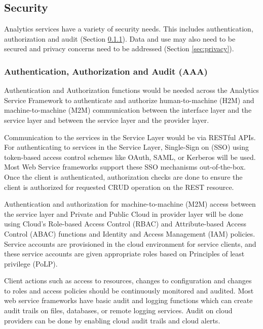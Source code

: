 
\subsection{Security}
\label{sec:security}

Analytics services have a variety of security needs. This includes
authentication, authorization and audit (Section \ref{sec:aaa}). Data
and use may also need to be secured and privacy concerns need to be
addressed (Section \ref{sec:privacy}).

\subsubsection{Authentication, Authorization and Audit (AAA)}\label{sec:aaa}

Authentication and Authorization functions would be needed across the
Analytics Service Framework to authenticate and authorize
human-to-machine (H2M) and machine-to-machine (M2M) communication
between the interface layer and the service layer and between the
service layer and the provider layer.

Communication to the services in the Service Layer would be via
RESTful APIs. For authenticating to services in the Service Layer,
Single-Sign on (SSO) using token-based access control schemes like
OAuth, SAML, or Kerberos will be used. Most Web Service frameworks
support these SSO mechanisms out-of-the-box. Once the client is
authenticated, authorization checks are done to ensure the client is
authorized for requested CRUD operation on the REST resource.

Authentication and authorization for machine-to-machine (M2M) access
between the service layer and Private and Public Cloud in provider
layer will be done using Cloud's Role-based Access Control (RBAC) and
Attribute-based Access Control (ABAC) functions and Identity and
Access Management (IAM) policies. Service accounts are provisioned in
the cloud environment for service clients, and these service accounts
are given appropriate roles based on Principles of least privilege
(PoLP).

Client actions such as access to resources, changes to configuration
and changes to roles and access policies should be continuously
monitored and audited. Most web service frameworks have basic audit
and logging functions which can create audit trails on files,
databases, or remote logging services. Audit on cloud providers can be
done by enabling cloud audit trails and cloud alerts.

